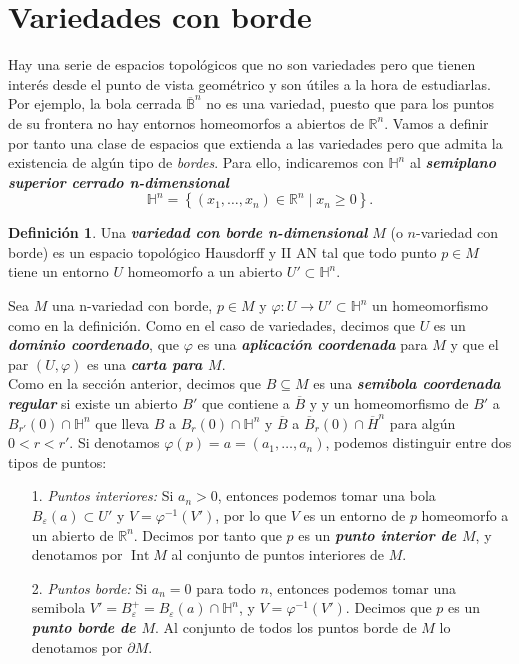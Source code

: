 \documentclass[10pt]{report}
\newcommand{\R}{\mathbb{R}}
\DeclareMathOperator{\interior}{Int} %
\newcommand{\enfatiza}[1]{\textbf{\textit{#1}}}
\theoremstyle{definition}
\newtheorem{defin}{Definición}[section]
\begin{document}
\section{Variedades con borde}\label{sec:borde}
Hay una serie de espacios topológicos que no son variedades pero que tienen interés desde el punto de vista geométrico y son útiles a la hora de estudiarlas. Por ejemplo, la bola cerrada $\overline{\mathbb{B}}^n$ no es una variedad, puesto que para los puntos de su frontera no hay entornos homeomorfos a abiertos de $\R^n$. Vamos a definir por tanto una clase de espacios que extienda a las variedades pero que admita la existencia de algún tipo de \textit{bordes}. Para ello, indicaremos con $\mathbb{H}^n$ al \enfatiza{semiplano superior cerrado n-dimensional} $$\mathbb{H}^n=
\left\{(x_1,\dots ,x_n)\in \R^n\mid x_n\geq 0\right\}.$$
\begin{defin}
Una \enfatiza{variedad con borde n-dimensional} $M$ (o $n$-variedad con borde) es un espacio topológico  Hausdorff y II AN tal que todo punto $p\in M$ tiene un entorno $U$ homeomorfo a un abierto $U'\subset \mathbb{H}^n$.
\end{defin}
Sea $M$ una n-variedad con borde, $p\in M$ y $\varphi :U\to U'\subset \mathbb{H}^n$ un homeomorfismo como en la definición. Como en el caso de variedades, decimos que $U$ es un \enfatiza{dominio coordenado}, que $\varphi$ es una \enfatiza{aplicación coordenada} para $M$ y que el par $(U,\varphi )$ es una \enfatiza{carta para $M$}.\\
Como en la sección anterior, decimos que $B\subseteq M$ es una \enfatiza{semibola coordenada regular} si existe un abierto $B'$ que contiene a $\overline{B}$ y y un homeomorfismo de $B'$ a $B_{r'}(0)\cap \mathbb{H}^n$ que lleva $B$ a $B_r(0)\cap \mathbb{H}^n$ y $\overline{B}$ a $\overline{B}_r(0)\cap \overline{H}^n$ para algún $0<r<r'$.
Si denotamos $\varphi (p)=a=(a_1,\dots ,a_n)$, podemos distinguir entre dos tipos de puntos:
\begin{itemize}

\item[1.] \textit{Puntos interiores:} Si $a_n>0$, entonces podemos tomar una bola $B_{\varepsilon}(a)\subset U'$ y $V=\varphi^{-1}(V')$, por lo que $V$ es un entorno de $p$ homeomorfo a un abierto de $\R^n$. Decimos por tanto que $p$ es un \enfatiza{punto interior de $M$}, y denotamos por $\interior{M}$ al conjunto de puntos interiores de $M$.
\item[2.] \textit{Puntos borde:} Si $a_n=0$ para todo $n$, entonces podemos tomar una semibola $V'=B_{\varepsilon}^{+}=B_{\varepsilon}(a)\cap \mathbb{H}^n$, y $V=\varphi^{-1}(V')$. Decimos que $p$ es un \enfatiza{punto borde de $M$}. Al conjunto de todos los puntos borde de $M$ lo denotamos por $\partial M$.
\end{itemize}
\end{document}
